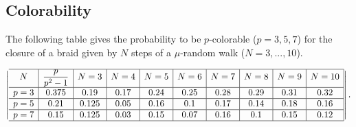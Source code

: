 \documentclass[12pt]{article}
\begin{document}
	 \subsection{Colorability}
	 The following table gives the probability to be $p$-colorable ($p=3,5,7$) for the closure of a braid given by $N$ steps of a $\mu$-random walk ($N=3,...,10$).
	 
	 \[ \left| \begin{array}
	 { c | c | c | c | c | c | c | c| c | c | c |c|c|c}	
	 
	 \hline
	 N&\dfrac{p}{p^2-1} &N=3 & N= 4 & N=5  & N=6 & N=7 & N=8 & N=9 & N=10 \\
	 \hline 
	 p=3&0.375 & 0.19 & 0.17& 0.24 &0.25  &0.28  &0.29  &0.31  &0.32  \\
	 \hline
	 p=5 &0.21 &0.125&  0.05& 0.16 &0.1  &0.17  &0.14  &0.18  &0.16  \\
	 \hline
	 p=7 &0.15 &0.125 &0.03  &0.15  &0.07  & 0.16 &0.1  &0.15  &0.12  \\
	 \hline
	 \end{array} \right|.\]
	 
\end{document}
